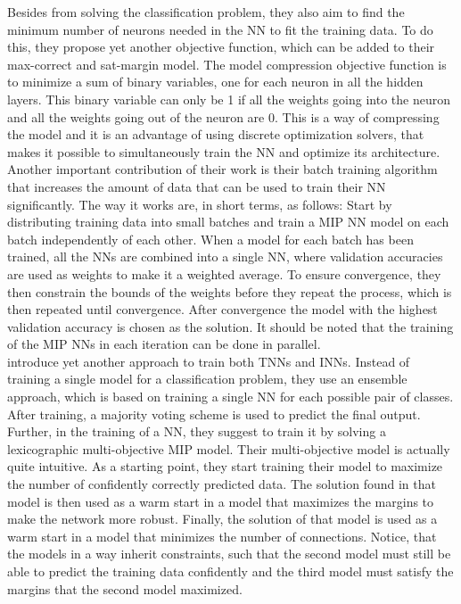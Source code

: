 \noindent Besides from solving the classification problem, they also aim to find the minimum number of neurons needed in the NN to fit the training data. To do this, they propose yet another objective function, which can be added to their max-correct and sat-margin model. The model compression objective function is to minimize a sum of binary variables, one for each neuron in all the hidden layers. This binary variable can only be 1 if all the weights going into the neuron and all the weights going out of the neuron are 0. This is a way of compressing the model and it is an advantage of using discrete optimization solvers, that makes it possible to simultaneously train the NN and optimize its architecture. \\

\noindent Another important contribution of their work is their batch training algorithm that increases the amount of data that can be used to train their NN significantly. The way it works are, in short terms, as follows: Start by distributing training data into small batches and train a MIP NN model on each batch independently of each other. When a model for each batch has been trained, all the NNs are combined into a single NN, where validation accuracies are used as weights to make it a weighted average. To ensure convergence, they then constrain the bounds of the weights before they repeat the process, which is then repeated until convergence. After convergence the model with the highest validation accuracy is chosen as the solution. It should be noted that the training of the MIP NNs in each iteration can be done in parallel. \\

\noindent \cite{ambrogio2023} introduce yet another approach to train both TNNs and INNs. Instead of training a single model for a classification problem, they use an ensemble approach, which is based on training a single NN for each possible pair of classes. After training, a majority voting scheme is used to predict the final output. Further, in the training of a NN, they suggest to train it by solving a lexicographic multi-objective MIP model. Their multi-objective model is actually quite intuitive. As a starting point, they start training their model to maximize the number of confidently correctly predicted data. The solution found in that model is then used as a warm start in a model that maximizes the margins to make the network more robust. Finally, the solution of that model is used as a warm start in a model that minimizes the number of connections. Notice, that the models in a way inherit constraints, such that the second model must still be able to predict the training data confidently and the third model must satisfy the margins that the second model maximized. \\

